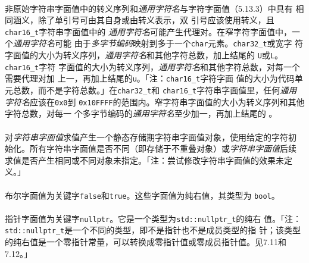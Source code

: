 \paragraph{}
非原始字符串字面值中的转义序列和\textit{通用字符名}与字符字面值（5.13.3）中具有
相同涵义，除了单引号\texttt{\sq}可由其自身或由转义\texttt{\bs\sq}表示，双
引号应该使用\textit{\bs}转义，且\texttt{char16\_t}字符串字面值中的
\textit{通用字符名}可能产生代理对。在窄字符字面值中，一个\textit{通用字符名}可能
由于\textit{多字节编码}映射到多于一个\texttt{char}元素。\texttt{char32\_t}或宽字
符字面值的大小为转义序列，\textit{通用字符名}和其他字符总数，加上结尾的
\texttt{U\sq{}\sq}或\texttt{L\sq{}\sq}。\texttt{char16\_t}字符
字面值的大小为转义序列，\textit{通用字符名}和其他字符总数，对每一个需要代理对加
上一，再加上结尾的\texttt{u\sq{}\sq}。「注：\texttt{char16\_t}字符字面
值的大小为代码单元总数，而不是字符总数。」在\texttt{char32\_t}和
\texttt{char16\_t}字符串字面值里，任何\textit{通用字符名}应该在\texttt{0x0}到
\texttt{0x10FFFF}的范围内。窄字符串字面值的大小为转义序列和其他字符总数，对每一
个多字节编码的\textit{通用字符名}至少加一，再加上结尾的
\texttt{\sq{}\sq}。

\paragraph{}
对\textit{字符串字面值}求值产生一个静态存储期字符串字面值对象，使用给定的字符初
始化。所有字符串字面值是否不同（即存储于不重叠对象）或\textit{字符串字面值}后续
求值是否产生相同或不同对象未指定。「注：尝试修改字符串字面值的效果未定义。」


\paragraph{}
布尔字面值为关键字\texttt{false}和\texttt{true}。这些字面值为纯右值，其类型为
\texttt{bool}。


\paragraph{}
指针字面值为关键字\texttt{nullptr}。它是一个类型为\texttt{std::nullptr\_t}的纯右
值。「注：\texttt{std::nullptr\_t}是一个不同的类型，即不是指针也不是成员类型的指
针；该类型的纯右值是一个零指针常量，可以转换成零指针值或零成员指针值。见7.11和
7.12。」

